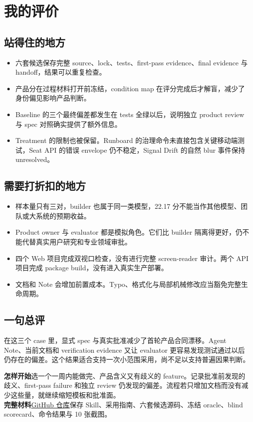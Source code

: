 \documentclass[11pt,fontset=fandol]{ctexart}
\begin{document}
\section{我的评价}

\subsection{站得住的地方}

\begin{itemize}
  \item 六套候选保存完整 source、lock、tests、first-pass evidence、final evidence 与 handoff，结果可以重复检查。
  \item 产品分在过程材料打开前冻结，condition map 在评分完成后才解盲，减少了身份偏见影响产品判断。
  \item Baseline 的三个最终偏差都发生在 tests 全绿以后，说明独立 product review 与 spec 对照确实提供了额外信息。
  \item Treatment 的限制也被保留。Runboard 的治理命令未直接包含关键移动端测试，Seat API 的错误 envelope 仍不稳定，Signal Drift 的自然 blur 事件保持 unresolved。
\end{itemize}

\subsection{需要打折扣的地方}

\begin{itemize}
  \item 样本量只有三对，builder 也属于同一类模型，22.17 分不能当作其他模型、团队或大系统的预期收益。
  \item Product owner 与 evaluator 都是模拟角色。它们比 builder 隔离得更好，仍不能代替真实用户研究和专业领域审批。
  \item 四个 Web 项目完成双视口检查，没有进行完整 screen-reader 审计。两个 API 项目完成 package build，没有进入真实生产部署。
  \item 文档和 Note 会增加前置成本。Typo、格式化与局部机械修改应当豁免完整生命周期。
\end{itemize}

\subsection{一句总评}

在这三个 case 里，显式 spec 与真实批准减少了首轮产品合同漂移。Agent Note、当前文档和 verification evidence 又让 evaluator 更容易发现测试通过以后仍存在的偏差。这个结果适合支持一次小范围采用，尚不足以支持普遍因果判断。

\begin{keybox}\small
\textbf{怎样开始}\quad 选一个一周内能做完、产品含义又有歧义的 feature。记录批准前发现的歧义、first-pass failure 和独立 review 仍发现的偏差。流程若只增加文档而没有减少这些量，就继续缩短模板和批准面。
\\[4pt]
\textbf{完整材料}\quad \href{https://github.com/Grenzlinie/dsh-development-spec-skill}{GitHub 仓库}保存 Skill、采用指南、六套候选源码、冻结 oracle、blind scorecard、命令结果与 10 张截图。
\end{keybox}
\end{document}
